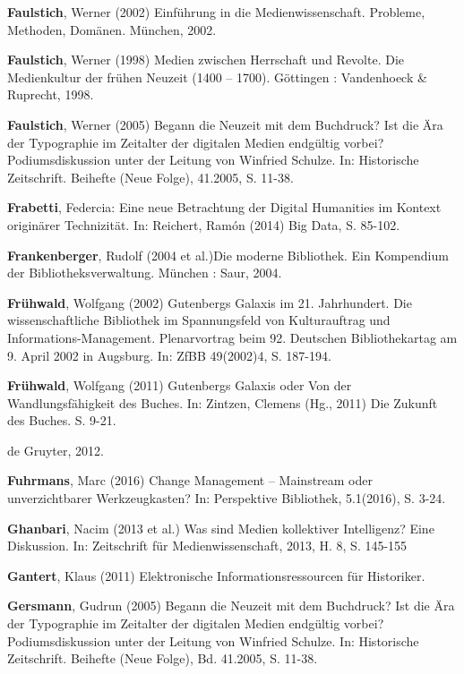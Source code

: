 \documentclass[a4paper,
fontsize=11pt,
oneside,
numbers=noperiodatend,
parskip=half-,
bibliography=totoc,
final
]{scrartcl}
\begin{document}
\textbf{Faulstich}, Werner (2002) Einführung in die Medienwissenschaft.
Probleme, Methoden, Domänen. München, 2002.

\textbf{Faulstich}, Werner (1998) Medien zwischen Herrschaft und
Revolte. Die Medienkultur der frühen Neuzeit (1400 -- 1700). Göttingen :
Vandenhoeck \& Ruprecht, 1998.

\textbf{Faulstich}, Werner (2005) Begann die Neuzeit mit dem Buchdruck?
Ist die Ära der Typographie im Zeitalter der digitalen Medien endgültig
vorbei? Podiumsdiskussion unter der Leitung von Winfried Schulze. In:
Historische Zeitschrift. Beihefte (Neue Folge), 41.2005, S. 11-38.

\textbf{Frabetti}, Federcia: Eine neue Betrachtung der Digital
Humanities im Kontext originärer Technizität. In: Reichert, Ramón (2014)
Big Data, S. 85-102.

\textbf{Frankenberger}, Rudolf (2004 et al.)Die moderne Bibliothek. Ein
Kompendium der Bibliotheksverwaltung. München : Saur, 2004.

\textbf{Frühwald}, Wolfgang (2002) Gutenbergs Galaxis im 21.
Jahrhundert. Die wissenschaftliche Bibliothek im Spannungsfeld von
Kulturauftrag und Informations-Management. Plenarvortrag beim 92.
Deutschen Bibliothekartag am 9. April 2002 in Augsburg. In: ZfBB
49(2002)4, S. 187-194.

\textbf{Frühwald}, Wolfgang (2011) Gutenbergs Galaxis oder Von der
Wandlungsfähigkeit des Buches. In: Zintzen, Clemens (Hg., 2011) Die
Zukunft des Buches. S. 9-21.

\begin{description}
\tightlist
\item[\textbf{Füssel}, Stephan (Hg.) Medienkonvergenz --
transdisziplinär. Berlin]
de Gruyter, 2012.
\end{description}

\textbf{Fuhrmans}, Marc (2016) Change Management -- Mainstream oder
unverzichtbarer Werkzeugkasten? In: Perspektive Bibliothek, 5.1(2016),
S. 3-24.

\textbf{Ghanbari}, Nacim (2013 et al.) Was sind Medien kollektiver
Intelligenz? Eine Diskussion. In: Zeitschrift für Medienwissenschaft,
2013, H. 8, S. 145-155

\textbf{Gantert}, Klaus (2011) Elektronische Informationsressourcen für
Historiker.

\textbf{Gersmann}, Gudrun (2005) Begann die Neuzeit mit dem Buchdruck?
Ist die Ära der Typographie im Zeitalter der digitalen Medien endgültig
vorbei? Podiumsdiskussion unter der Leitung von Winfried Schulze. In:
Historische Zeitschrift. Beihefte (Neue Folge), Bd. 41.2005, S. 11-38.
\end{document}
